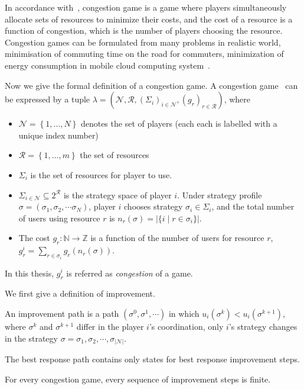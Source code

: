 In accordance with~\cite{Voecking06congestiongames}, congestion game is a game where players simultaneously allocate sets of resources to minimize their costs, and the cost of a resource is a function of congestion, which is the number of players choosing the resource.
Congestion games can be formulated from many problems in realistic world, \eg minimisation of commuting time on the road for commuters, minimization of energy consumption in mobile cloud computing system~\cite{game_cloudcomputing_energy12}.


Now we give the formal definition of a congestion game.
A congestion game~\cite{Rosenthal}\cite{Voecking06congestiongames} can be expressed by a tuple $\lambda=(\mathcal{N},\mathcal{R},(\Sigma_i)_{i \in \mathcal{N}},(g_r)_{r\in \mathcal{R}})$, where
\begin{itemize}
\item $\mathcal{N}=\left\{1,\ldots,N\right\}$ denotes the set of players (each each is labelled with a unique index number)
\item $\mathcal{R}=\left\{1,\ldots,m\right\}$ the set of resources
\item $\Sigma_i$ is the set of resources for player to use.
\item $\Sigma_{i\in\mathcal{N}} \subseteq 2^{\mathcal{R}}$ is the strategy space of player $i$. 
Under strategy profile $\sigma=(\sigma_1,\sigma_2,\cdots \sigma_N)$, player $i$ chooses strategy $\sigma_i\in \Sigma_i$, and the total number of users using resource $r$ is $n_r(\sigma)=|\{i\mid r\in \sigma_i\}|$. 
\item The cost $g_r: \mathbb{N}\rightarrow \mathbb{Z}$ is a function of the number of users for resource $r$, $g_r^i=\sum_{r\in \sigma_i} g_r(n_r(\sigma))$. 
\end{itemize}
In this thesis, $g_r^i$ is referred as \textit{congestion} of a game.

We first give a definition of improvement.
\begin{mydef}
An improvement path is a path $(\sigma^0, \sigma^1, \cdots)$ in which $u_i(\sigma^k) < u_i(\sigma^{k+1}) $, where $\sigma^k$ and $\sigma^{k+1}$ differ in the player $i$'s coordination, \ie only $i$'s strategy changes in the strategy $\sigma={\sigma_1, \sigma_2, \cdots, \sigma_{|\mathcal{N}|}}$.
\end{mydef}
The best response path contains only states for best response improvement steps.


\begin{theorem}
\label{background:finiteImprovement}
For every congestion game, every sequence of improvement steps is finite.~\cite{Rosenthal}
\end{theorem}

